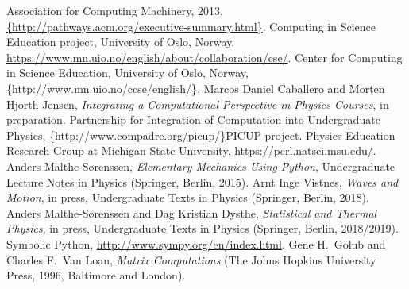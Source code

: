 \documentclass[graybox,envcountchap,sectrefs]{svmult}
\begin{document}
\begin{thebibliography}{99}
 Association for Computing Machinery, 2013, \url{{http://pathways.acm.org/executive-summary.html}}.
 Computing in Science Education project, University of Oslo, Norway, \url{https://www.mn.uio.no/english/about/collaboration/cse/}.
Center for Computing in Science Education, University of Oslo, Norway,  \url{{http://www.mn.uio.no/ccse/english/}}.
 Marcos Daniel Caballero and Morten Hjorth-Jensen, {\em Integrating a Computational Perspective in Physics Courses}, in preparation.
 Partnership for Integration of Computation into Undergraduate Physics, \url{{http://www.compadre.org/picup/}}{PICUP project}.
 Physics Education Research Group at Michigan State University, \url{https://perl.natsci.msu.edu/}.
Anders Malthe-S{\o}renssen, {\em Elementary Mechanics Using Python},
Undergraduate Lecture Notes in Physics (Springer, Berlin, 2015).
 Arnt Inge Vistnes, {\em Waves and Motion}, in press, Undergraduate Texts in Physics (Springer, Berlin, 2018).
 Anders Malthe-S{\o}renssen and Dag Kristian Dysthe, {\em Statistical and Thermal Physics}, in press,  Undergraduate Texts in Physics (Springer, Berlin, 2018/2019).
 Symbolic Python, \url{http://www.sympy.org/en/index.html}.
 Gene H.~Golub and Charles F.~Van Loan, {\em Matrix Computations} (The Johns Hopkins University Press, 1996, Baltimore and London).
\end{thebibliography}


\end{document}
